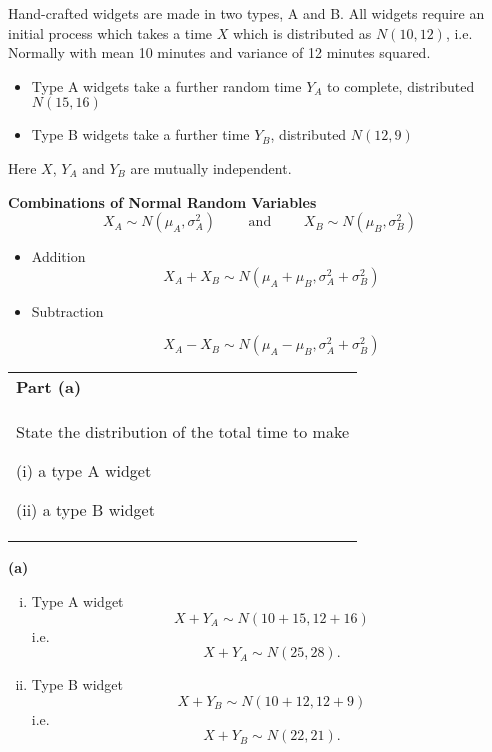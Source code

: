 \documentclass[a4paper,12pt]{article}
\begin{document}
	\large
	
	\noindent Hand-crafted widgets are made in two types, A and B. All widgets require an initial
	process which takes a time $X$ which is distributed as $N(10, 12)$, i.e. Normally with
	mean 10 minutes and variance of 12 minutes squared. 
	
	\begin{itemize}
		\item Type A widgets take a further random
		time $Y_A$ to complete, distributed $N(15, 16)$
		\item Type B widgets take a further time $Y_B$,
		distributed $N(12, 9)$
	\end{itemize}
	Here $X$, $Y_A$ and $Y_B$ are mutually independent.
	\newpage
	
	\noindent \textbf{Combinations of Normal Random Variables}
	\[X_A \sim N(\mu_A, \sigma^2_A) \qquad \mbox{ and } \qquad  X_B \sim N(\mu_B, \sigma^2_B)\]
	
	\begin{itemize}
		\item Addition
		\[X_A +X_B \sim N(\mu_A + \mu_B , \sigma^2_A +  \sigma^2_B)\]
		
		\item Subtraction
		
		\[X_A - X_B \sim N(\mu_A - \mu_B , \sigma^2_A +  \sigma^2_B)\]
	\end{itemize}
	\begin{table}
		\begin{tabular}{|p{15cm}|}
			\hline \large
			\noindent  \textbf{Part (a)}\\
			\large
			State the distribution of the total time to make
			
			(i) a type A widget
			
			(ii) a type B widget
			\\ \hline
		\end{tabular}
	\end{table}
	\vspace{0.8cm}
	\noindent \textbf{(a)}
	\begin{enumerate}[(i)]
		\item Type A widget \[X + Y_A \sim N(10 + 15 , 12 + 16)\] i.e. \[X + Y_A \sim  N(25, 28).\]
		\item Type B widget\[ X + Y_B \sim N(10 + 12 , 12 + 9)\] i.e. \[ X + Y_B \sim N(22, 21).\]
	\end{enumerate}
	\newpage
	
\end{document}
